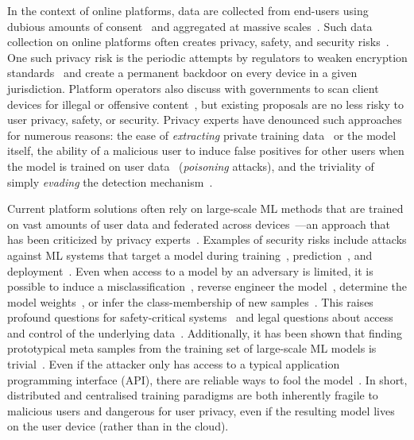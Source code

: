 \documentclass[preprint,12pt]{article}
\begin{document}
In the context of online platforms, data are collected from end-users using dubious amounts of consent~\cite{nouwens2020dark} and aggregated at massive scales~\cite{desislavov2021compute}. 
Such data collection on online platforms often creates privacy, safety, and security risks~\cite{chakraborty_adversarial_2018,meyers}. 
One such privacy risk is the periodic attempts by regulators to weaken encryption standards~\cite{amnesty_encryption} and create a permanent backdoor on every device in a given jurisdiction.
Platform operators also discuss with governments to scan client devices for illegal or offensive content~\cite{chat_control,apple_csam}, but existing proposals are no less risky to user privacy, safety, or security.
Privacy experts have denounced such approaches for numerous reasons: the ease of \textit{extracting} private training data~\cite{choquette2021label,fredrikson_model_2015,li2021membership} or the model~\cite{fredrikson_model_2015,orekondy2019knockoff,jagielski2020high,correia2018copycat,shokri2017membership} itself, the ability of a malicious user to induce false positives for other users when the model is trained on user data~\cite{rawat2022devil,shokri2020bypassing,gu2017badnets,saha2020hidden,aghakhani2021bullseye,turner2018clean,shafahi2018poison,geiping2020witches,souri2022sleeper} (\textit{poisoning} attacks), and the triviality of simply \textit{evading} the detection mechanism~\cite{carlini_towards_2017,dohmatob_generalized_2019,hopskipjump,biggio_evasion_2013,meyers,chakraborty_adversarial_2018,deepfool,hopskipjump}.

Current platform solutions often rely on large-scale ML methods that are trained on vast amounts of user data and federated across devices~\cite{apple_csam}---an approach that has been criticized by privacy experts~\cite{abelson2024bugs}. 
Examples of security risks include attacks against ML systems that target a model during training~\cite{biggio_poisoning_2013}, prediction~\cite{biggio_evasion_2013,deepfool,carlini_towards_2017}, and deployment~\cite{distributed_attacks,santos2021universal}. 
Even when access to a model by an adversary is limited, it is possible to induce a misclassification~\cite{hopskipjump}, reverse engineer the model~\cite{extraction_attack}, determine the model weights~\cite{jagielski2020high}, or infer the class-membership of new samples~\cite{bentley2020quantifying}. 
This raises profound questions for safety-critical systems~\cite{meyers} and legal questions about access and control of the underlying data~\cite{mitrou2018data,marks2023ai}.
Additionally, it has been shown that finding prototypical meta samples from the training set of large-scale ML models is trivial~\cite{chakraborty_adversarial_2018}. 
Even if the attacker only has access to a typical application programming interface (API), there are reliable ways to fool the model~\cite{hopskipjump}. 
In short, distributed and centralised training paradigms are both inherently fragile to malicious users and dangerous for user privacy, even if the resulting model lives on the user device (rather than in the cloud). 
\end{document}
